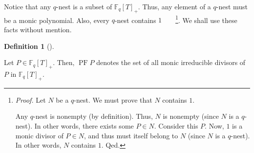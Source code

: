 \documentclass[numbers=enddot,12pt,final,onecolumn,notitlepage]{scrartcl}%
\theoremstyle{definition}
\newtheorem{defi}[theo]{Definition}
\newenvironment{definition}[1][]
{\begin{defi}[#1]\begin{leftbar}}
{\end{leftbar}\end{defi}}
\begin{document}
Notice that any $q$-nest is a subset of $\mathbb{F}_{q}\left[  T\right]  _{+}%
$. Thus, any element of a $q$-nest must be a monic polynomial. Also, every
$q$-nest contains $1$\ \ \ \ \footnote{\textit{Proof.} Let $N$ be a $q$-nest.
We must prove that $N$ contains $1$.
\par
Any $q$-nest is nonempty (by definition). Thus, $N$ is nonempty (since $N$ is
a $q$-nest). In other words, there exists some $P\in N$. Consider this $P$.
Now, $1$ is a monic divisor of $P\in N$, and thus must itself belong to $N$
(since $N$ is a $q$-nest). In other words, $N$ contains $1$. Qed.}. We shall
use these facts without mention.

\begin{definition}
\label{def.PF(q)}Let $P\in\mathbb{F}_{q}\left[  T\right]  _{+}$. Then,
$\operatorname{PF}P$ denotes the set of all monic irreducible divisors of $P$
in $\mathbb{F}_{q}\left[  T\right]  _{+}$.
\end{definition}
\end{document}
